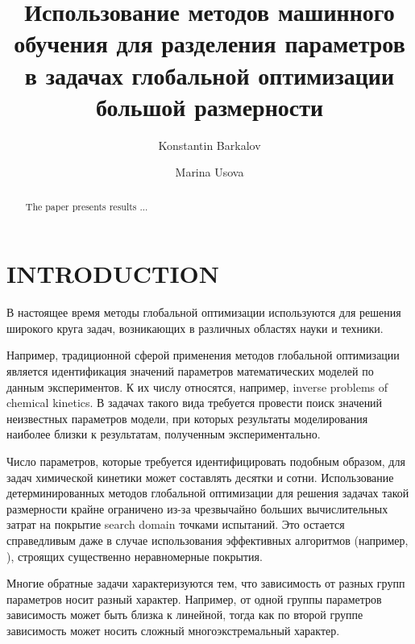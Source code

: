 \documentclass{aip-cp}
\begin{document}
\title{Использование методов машинного обучения для разделения параметров в задачах глобальной оптимизации большой размерности}

\author[aff1]{Konstantin Barkalov}
\author[aff1]{Marina Usova}


\maketitle

\begin{abstract}
The paper presents results ...
\end{abstract}

\section{INTRODUCTION}

В настоящее время методы глобальной оптимизации используются для решения широкого круга задач, возникающих в различных областях науки и техники. 

Например, традиционной сферой применения методов глобальной оптимизации является идентификация значений параметров математических моделей по данным экспериментов. К их числу относятся, например, inverse problems of chemical kinetics.  В задачах такого вида требуется провести поиск значений неизвестных параметров модели, при которых результаты моделирования наиболее близки к результатам, полученным экспериментально.

Число параметров, которые требуется идентифицировать подобным образом, для задач химической кинетики может составлять десятки и сотни. Использование детерминированных методов глобальной оптимизации для решения задачах такой размерности крайне ограничено из-за чрезвычайно больших вычислительных затрат на покрытие search domain точками испытаний. Это остается справедливым даже в случае использования эффективных алгоритмов (например, \cite{Paulavicius2011,Evtushenko2009,Jones2009}), строящих существенно неравномерные покрытия. 

Многие обратные задачи характеризуются тем, что зависимость от разных групп параметров носит разный характер. Например, от одной группы параметров зависимость может быть близка к линейной, тогда как по второй группе зависимость может носить сложный многоэкстремальный характер.
\end{document}
